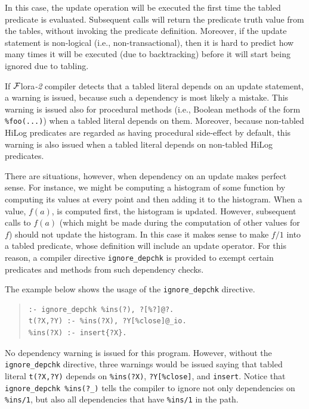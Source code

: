 \documentclass[11pt]{article}
\newcommand{\FLORA}{{\mbox{\sc ${\cal F}${lora}\rm\emph{-2}}}\xspace}
\begin{document}
In this case, the update operation will be executed the first time the
tabled predicate is evaluated. Subsequent calls will return the predicate truth
value from the tables, without invoking the predicate definition.
Moreover, if the update statement is non-logical (i.e.,
non-transactional), then it is hard to predict how many times it will be
executed (due to backtracking) before it will start being ignored due to
tabling.

If \FLORA compiler detects that a tabled literal depends on an update
statement, a warning is issued, because such a dependency is most likely a
mistake. This warning is issued also for procedural methods (i.e.,
Boolean methods of the form {\tt \%foo(...)}) when a tabled literal depends
on them. Moreover, because non-tabled HiLog predicates are regarded as having
procedural side-effect by default, this warning is also issued when a
tabled literal depends on non-tabled HiLog predicates.   

There are situations, however, when dependency on an update makes perfect
sense. For instance, we might be computing a histogram of some function
by computing its values at every point and then adding it to the
histogram. When a value, $f(a)$, is computed first, the histogram is
updated. However, subsequent calls to $f(a)$ (which might be made during
the computation of other values for $f$) should not update the histogram.
In this case it makes sense to make $f/1$ into a tabled predicate, whose
definition will include an update operator. For this reason, a compiler
directive {\tt ignore\_depchk} is provided to exempt certain predicates
and methods from such dependency checks.

The example below shows the usage of the {\tt ignore\_depchk} directive.
\begin{quote}
\begin{verbatim}
:- ignore_depchk %ins(?), ?[%?]@?.
t(?X,?Y) :- %ins(?X), ?Y[%close]@_io. 
%ins(?X) :- insert{?X}. 
\end{verbatim}
\end{quote}
No dependency warning is issued for this program. However, without the
{\tt ignore\_depchk} directive, three warnings would be issued saying that
tabled literal {\tt t(?X,?Y)} depends on {\tt \%ins(?X)}, {\tt ?Y[\%close]},
and {\tt insert}. Notice that {\tt ignore\_depchk \%ins(?\_)} tells the
compiler to ignore not only dependencies on {\tt \%ins/1}, but also all
dependencies that have {\tt \%ins/1} in the path.
\end{document}
